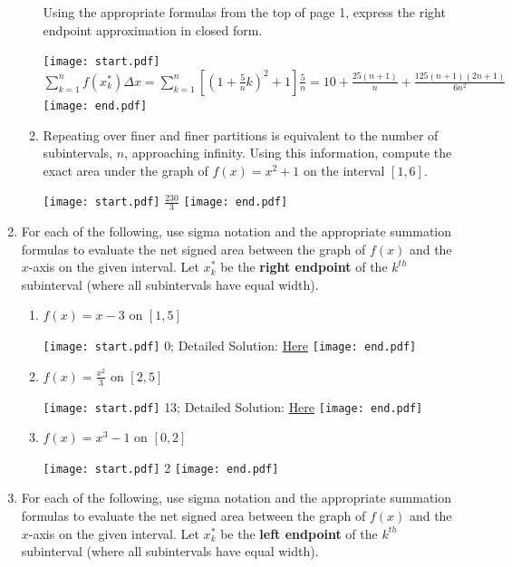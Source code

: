 \documentclass[12pt]{article}
\begin{document}
\begin{enumerate}
\begin{enumerate}
Using the appropriate formulas from the top of page 1, express the right endpoint approximation in closed form.

\texttt{[image: start.pdf]}
{{$\sum_{k=1}^n{f(x_k^*)\Delta x}=\sum_{k=1}^n\left[\left(1+\frac{5}{n}k\right)^2+1\right]\frac{5}{n}=10+\frac{25(n+1)}{n}+\frac{125(n+1)(2n+1)}{6n^2}$}}
\texttt{[image: end.pdf]}


\item Repeating over finer and finer partitions is equivalent to the number of subintervals, $n$, approaching infinity.  Using this information, compute the exact area under the graph of $f(x)=x^2+1$ on the interval $[1,6]$.

\texttt{[image: start.pdf]}
{{$\frac{230}{3}$}}
\texttt{[image: end.pdf]}


\end{enumerate}

\item For each of the following, use sigma notation and the appropriate summation formulas to evaluate the net signed area between the graph of $f(x)$ and the $x$-axis on the given interval.  Let $x_k^*$ be the {\bf right endpoint} of the $k^{th}$ subinterval (where all subintervals have equal width).

\begin{enumerate}

\item $f(x)=x-3$ on $[1,5]$

\texttt{[image: start.pdf]}
{{0; Detailed Solution: \textcolor{blue}{\href{http://www.math.drexel.edu/classes/Calculus/resources/Math122HW/Solutions/122_01_Area_Limit_19a.pdf}{Here}}}}
\texttt{[image: end.pdf]}


\item $f(x)=\frac{x^2}{3}$ on $[2,5]$

\texttt{[image: start.pdf]}
{{13; Detailed Solution: \textcolor{blue}{\href{http://www.math.drexel.edu/classes/Calculus/resources/Math122HW/Solutions/122_01_Area_Limit_19b.pdf}{Here}}}}
\texttt{[image: end.pdf]}


\item $f(x)=x^3-1$ on $[0,2]$

\texttt{[image: start.pdf]}
{{2}}
\texttt{[image: end.pdf]}


\end{enumerate}

\item For each of the following, use sigma notation and the appropriate summation formulas to evaluate the net signed area between the graph of $f(x)$ and the $x$-axis on the given interval.  Let $x_k^*$ be the {\bf left endpoint} of the $k^{th}$ subinterval (where all subintervals have equal width).


\end{enumerate}
\end{document}
